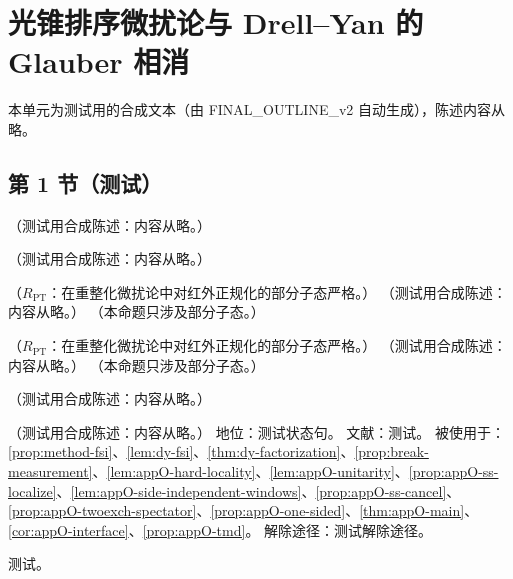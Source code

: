 \chapter{光锥排序微扰论与 Drell–Yan 的 Glauber 相消}\label{app:appO}
本单元为测试用的合成文本（由 FINAL\_OUTLINE\_v2 自动生成），陈述内容从略。

\section{第 1 节（测试）}\label{sec:appO-overview}

\begin{definition}[领头区域的数据]\label{def:appO-leading-data}
（测试用合成陈述：内容从略。）
\end{definition}

\begin{definition}\label{def:appO-lcopt}
（测试用合成陈述：内容从略。）
\end{definition}

\begin{lemma}\label{lem:appO-lcopt}
（$R_{\mathrm{PT}}$：在重整化微扰论中对红外正规化的部分子态严格。）
（测试用合成陈述：内容从略。）
（本命题只涉及部分子态。）
\end{lemma}

\begin{lemma}\label{lem:appO-numerators}
（$R_{\mathrm{PT}}$：在重整化微扰论中对红外正规化的部分子态严格。）
（测试用合成陈述：内容从略。）
（本命题只涉及部分子态。）
\end{lemma}

\begin{remark}[与 $V_H$ 重合的接触顶点在领头幂次不出现]\label{rem:appO-contact}
（测试用合成陈述：内容从略。）
\end{remark}

\begin{assumption}\label{asm:appO-lcopt}
（测试用合成陈述：内容从略。）
地位：测试状态句。
文献：测试。
被使用于：\cref{prop:method-fsi}、\cref{lem:dy-fsi}、\cref{thm:dy-factorization}、\cref{prop:break-measurement}、\cref{lem:appO-hard-locality}、\cref{lem:appO-unitarity}、\cref{prop:appO-ss-localize}、\cref{lem:appO-side-independent-windows}、\cref{prop:appO-ss-cancel}、\cref{prop:appO-twoexch-spectator}、\cref{prop:appO-one-sided}、\cref{thm:appO-main}、\cref{cor:appO-interface}、\cref{prop:appO-tmd}。
解除途径：测试解除途径。
\end{assumption}
\begin{proofsketch}测试。\end{proofsketch}

